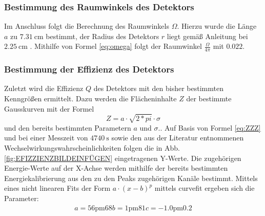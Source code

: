 \subsubsection{Bestimmung des Raumwinkels des Detektors}
Im Anschluss folgt die Berechnung des Raumwinkels $\Omega$. Hierzu wurde die Länge $a$ zu $\SI{7.31}{\centi\meter}$ bestimmt, der Radius des Detektors $r$ liegt gemäß Anleitung bei $\SI{2.25}{\centi\meter}$ \cite{V18}. Mithilfe von Formel \eqref{eq:omega} folgt der Raumwinkel $\frac{\Omega}{4 \pi}$ mit $0.022$.
\subsubsection{Bestimmung der Effizienz des Detektors}
Zuletzt wird die Effizienz $Q$ des Detektors mit den bisher bestimmten Kenngrößen ermittelt. Dazu werden die Flächeninhalte $Z$ der bestimmte Gausskurven mit der Formel 
\begin{equation}
    Z = a \cdot \sqrt{2 *pi} \cdot \sigma \label{eq:flach}
\end{equation}
und den bereits bestimmten Parametern $a$ und $\sigma$.. Auf Basis von Formel \eqref{eq:ZZZ} und bei einer Messzeit von $\SI{4740}{\second}$ sowie den aus der Literatur entnommenen Wechselwirkungswahrscheinlichkeiten\cite{Eu152} folgen die in Abb. \ref{fig:EFIZZIENZBILDEINFÜGEN} eingetragenen Y-Werte. Die zugehörigen Energie-Werte auf der X-Achse werden mithilfe der bereits bestimmten Energiekalibrierung aus den zu den Peaks zugehörigen Kanäle bestimmt. Mittels eines nicht linearen Fits der Form $a \cdot (x-b)^p$ mittels curvefit \cite{scipy} ergeben sich die Parameter:
\begin{gather*}
    a = \si{56 \pm 68}
    b = \si{1\pm 81}
    c = \si{-1.0 \pm 0.2}
\end{gather*}

